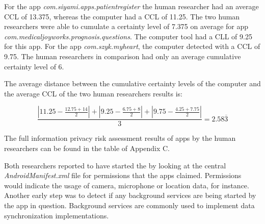 For the app \textit{com.siyami.apps.patientregister} the human researcher had an average CCL of 13.375, whereas the computer had a CCL of 11.25.
The two human researchers were able to cumulate a certainty level of 7.375 on average for app \linebreak\textit{com.medicaljoyworks.prognosis.questions}.
The computer tool had a CLL of 9.25 for this app.
For the app \textit{com.szyk.myheart}, the computer detected \ipr with a CCL of 9.75.
The human researchers in comparison had only an average cumulative certainty level of 6.

The average distance between the cumulative certainty levels of the computer and the average CCL of the two human researchers results is:

\begin{equation}
	\frac{|11.25 - \frac{12.75 + 14}{2}| + |9.25 - \frac{6.75 + 8}{2}| + |9.75 - \frac{4.25 + 7.75}{2}|}{3}=2.58\overline{3}
\end{equation}

The full information privacy risk assessment results of apps by the human researchers can be found in the table of Appendix C.

Both researchers reported to have started the \sca by looking at the central \textit{AndroidManifest.xml} file for permissions that the apps claimed.
Permissions would indicate the usage of camera, microphone or location data, for instance.
Another early step was to detect if any background services are being started by the app in question.
Background services are commonly used to implement data synchronization implementations.
